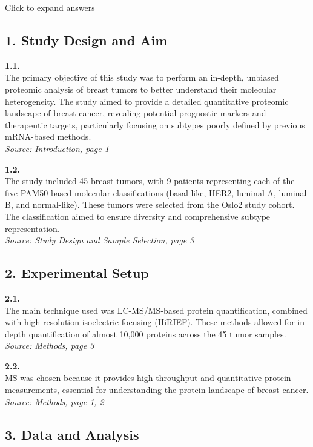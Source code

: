 \documentclass[
  letterpaper,
  DIV=11,
  numbers=noendperiod]{scrartcl}
\begin{document}
Click to expand answers

\subsection{1. Study Design and Aim}\label{study-design-and-aim-1}

\textbf{1.1.}\\
The primary objective of this study was to perform an in-depth, unbiased
proteomic analysis of breast tumors to better understand their molecular
heterogeneity. The study aimed to provide a detailed quantitative
proteomic landscape of breast cancer, revealing potential prognostic
markers and therapeutic targets, particularly focusing on subtypes
poorly defined by previous mRNA-based methods.\\
\emph{Source: Introduction, page 1}

\textbf{1.2.}\\
The study included 45 breast tumors, with 9 patients representing each
of the five PAM50-based molecular classifications (basal-like, HER2,
luminal A, luminal B, and normal-like). These tumors were selected from
the Oslo2 study cohort. The classification aimed to ensure diversity and
comprehensive subtype representation.\\
\emph{Source: Study Design and Sample Selection, page 3}

\subsection{2. Experimental Setup}\label{experimental-setup-1}

\textbf{2.1.}\\
The main technique used was LC-MS/MS-based protein quantification,
combined with high-resolution isoelectric focusing (HiRIEF). These
methods allowed for in-depth quantification of almost 10,000 proteins
across the 45 tumor samples.\\
\emph{Source: Methods, page 3}

\textbf{2.2.}\\
MS was chosen because it provides high-throughput and quantitative
protein measurements, essential for understanding the protein landscape
of breast cancer.\\
\emph{Source: Methods, page 1, 2}

\subsection{3. Data and Analysis}\label{data-and-analysis-1}
\end{document}
